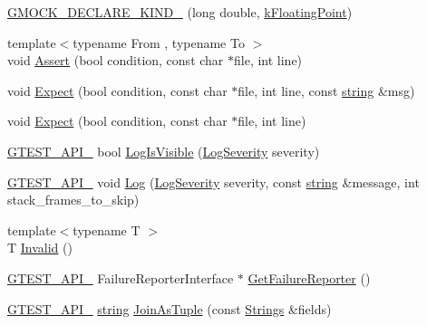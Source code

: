 \begin{DoxyCompactItemize}
\item 
\hyperlink{namespacetesting_1_1internal_af46fdd94d8aea0da729b554de443315f}{G\+M\+O\+C\+K\+\_\+\+D\+E\+C\+L\+A\+R\+E\+\_\+\+K\+I\+N\+D\+\_\+} (long double, \hyperlink{namespacetesting_1_1internal_aa8747bda20137c9aa7f846dee830e686acdce59b8c136926ace18aa9c2995878d}{k\+Floating\+Point})
\item 
{\footnotesize template$<$typename From , typename To $>$ }\\void \hyperlink{namespacetesting_1_1internal_a7a259643b7f2d23ce2b757728df42c99}{Assert} (bool condition, const char $\ast$file, int line)
\item 
void \hyperlink{namespacetesting_1_1internal_ab3000fc56be000e4fa6ed7cdcfee3106}{Expect} (bool condition, const char $\ast$file, int line, const \hyperlink{namespacetesting_1_1internal_a8e8ff5b11e64078831112677156cb111}{string} \&msg)
\item 
void \hyperlink{namespacetesting_1_1internal_a0dfe8a755bd02aa5ea162764b61a9d97}{Expect} (bool condition, const char $\ast$file, int line)
\item 
\hyperlink{gtest-port_8h_aa73be6f0ba4a7456180a94904ce17790}{G\+T\+E\+S\+T\+\_\+\+A\+P\+I\+\_\+} bool \hyperlink{namespacetesting_1_1internal_a69ffdba5ee36743e88d8f89b79e566ff}{Log\+Is\+Visible} (\hyperlink{namespacetesting_1_1internal_a203d1a8a2147a53d12bbdae40d443914}{Log\+Severity} severity)
\item 
\hyperlink{gtest-port_8h_aa73be6f0ba4a7456180a94904ce17790}{G\+T\+E\+S\+T\+\_\+\+A\+P\+I\+\_\+} void \hyperlink{namespacetesting_1_1internal_ac0bc151763a8187d74387c4b2ba685c9}{Log} (\hyperlink{namespacetesting_1_1internal_a203d1a8a2147a53d12bbdae40d443914}{Log\+Severity} severity, const \hyperlink{namespacetesting_1_1internal_a8e8ff5b11e64078831112677156cb111}{string} \&message, int stack\+\_\+frames\+\_\+to\+\_\+skip)
\item 
{\footnotesize template$<$typename T $>$ }\\T \hyperlink{namespacetesting_1_1internal_a3316c24e8a79f5def3e85d763ae50854}{Invalid} ()
\item 
\hyperlink{gtest-port_8h_aa73be6f0ba4a7456180a94904ce17790}{G\+T\+E\+S\+T\+\_\+\+A\+P\+I\+\_\+} Failure\+Reporter\+Interface $\ast$ \hyperlink{namespacetesting_1_1internal_aa261c22df383e9007129c92e36e30e62}{Get\+Failure\+Reporter} ()
\item 
\hyperlink{gtest-port_8h_aa73be6f0ba4a7456180a94904ce17790}{G\+T\+E\+S\+T\+\_\+\+A\+P\+I\+\_\+} \hyperlink{namespacetesting_1_1internal_a8e8ff5b11e64078831112677156cb111}{string} \hyperlink{namespacetesting_1_1internal_a61d60981533cb0875bad9025e0d98b74}{Join\+As\+Tuple} (const \hyperlink{namespacetesting_1_1internal_a7706b17f05f4b49e351b052ae4e05073}{Strings} \&fields)

\end{DoxyCompactItemize}
